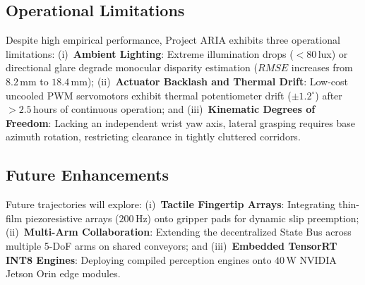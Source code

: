 \documentclass[journal]{IEEEtran}
\begin{document}
\begin{table}[!t]
\centering
\caption{System Deployment Capital Cost Comparison (USD)}
\label{table_cost_comparison}
\footnotesize
{}
\end{table}

\subsection{Operational Limitations}
Despite high empirical performance, Project ARIA exhibits three operational limitations: (i)~\textbf{Ambient Lighting}: Extreme illumination drops ($<80$\,lux) or directional glare degrade monocular disparity estimation ($RMSE$ increases from $8.2$\,mm to $18.4$\,mm); (ii)~\textbf{Actuator Backlash and Thermal Drift}: Low-cost uncooled PWM servomotors exhibit thermal potentiometer drift ($\pm 1.2^\circ$) after $>2.5$\,hours of continuous operation; and (iii)~\textbf{Kinematic Degrees of Freedom}: Lacking an independent wrist yaw axis, lateral grasping requires base azimuth rotation, restricting clearance in tightly cluttered corridors.

\subsection{Future Enhancements}
Future trajectories will explore: (i)~\textbf{Tactile Fingertip Arrays}: Integrating thin-film piezoresistive arrays ($200$\,Hz) onto gripper pads for dynamic slip preemption; (ii)~\textbf{Multi-Arm Collaboration}: Extending the decentralized State Bus across multiple 5-DoF arms on shared conveyors; and (iii)~\textbf{Embedded TensorRT INT8 Engines}: Deploying compiled perception engines onto $40$\,W NVIDIA Jetson Orin edge modules.
\end{document}
